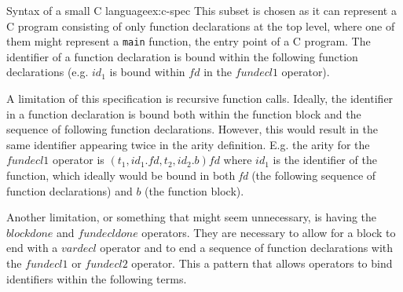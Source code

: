 \begin{example}{Syntax of a small C language}{ex:c-spec}
  This subset is chosen as it can represent a C program consisting of only function declarations at the top level, where one of them might represent a \texttt{main} function, the entry point of a C program. The identifier of a function declaration is bound within the following function declarations (e.g. $id_1$ is bound within $\textit{fd}$ in the $\textit{fundecl1}$ operator).

  A limitation of this specification is recursive function calls. Ideally, the identifier in a function declaration is bound both within the function block and the sequence of following function declarations. However, this would result in the same identifier appearing twice in the arity definition. E.g. the arity for the $\textit{fundecl1}$ operator is $(t_1,id_1.\textit{fd},t_2,id_2.b)fd$ where $id_1$ is the identifier of the function, which ideally would be bound in both \textit{fd} (the following sequence of function declarations) and $b$ (the function block).

  Another limitation, or something that might seem unnecessary, is having the $blockdone$ and $fundecldone$ operators. They are necessary to allow for a block to end with a $vardecl$ operator and to end a sequence of function declarations with the $fundecl1$ or $fundecl2$ operator. This a pattern that allows operators to bind identifiers within the following terms.

\end{example}
